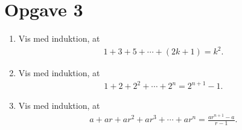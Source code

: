 \section*{Opgave 3}
\begin{enumerate}[label=\roman*)]
\item Vis med induktion, at 
\begin{align*}
1+3+5+\cdots +(2k+1) = k^2.
\end{align*}
\item Vis med induktion, at 
\begin{align*}
1+2+2^2+\cdots+2^n = 2^{n+1}-1.
\end{align*}
\item Vis med induktion, at 
\begin{align*}
a+ar+ar^2+ar^3+\cdots+ar^n = \frac{ar^{n+1}-a}{r-1}.
\end{align*}
\end{enumerate}